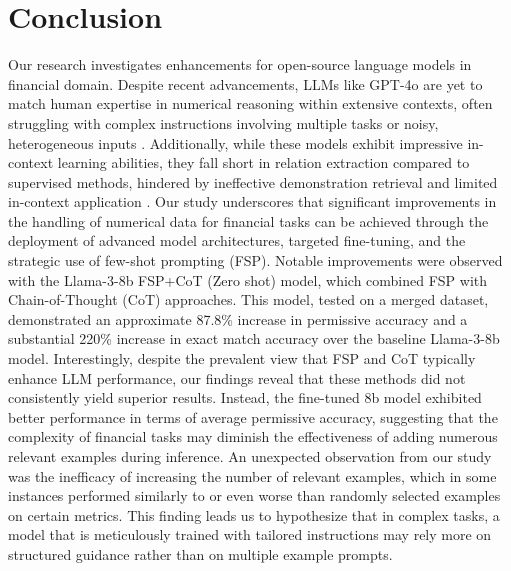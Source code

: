 \documentclass[logo,msc]{infthesis}           %
\begin{document}
\chapter{Conclusion}
Our research investigates enhancements for open-source language models in financial domain. Despite recent advancements, LLMs like GPT-4o are yet to match human expertise in numerical reasoning within extensive contexts, often struggling with complex instructions involving multiple tasks or noisy, heterogeneous inputs \cite{zhao2024docmathevalevaluatingmathreasoning, he2024can}. Additionally, while these models exhibit impressive in-context learning abilities, they fall short in relation extraction compared to supervised methods, hindered by ineffective demonstration retrieval and limited in-context application \cite{li2024recallretrievereasonbetter}. Our study underscores that significant improvements in the handling of numerical data for financial tasks can be achieved through the deployment of advanced model architectures, targeted fine-tuning, and the strategic use of few-shot prompting (FSP). Notable improvements were observed with the Llama-3-8b FSP+CoT (Zero shot) model, which combined FSP with Chain-of-Thought (CoT) approaches. This model, tested on a merged dataset, demonstrated an approximate 87.8\% increase in permissive accuracy and a substantial 220\% increase in exact match accuracy over the baseline Llama-3-8b model. Interestingly, despite the prevalent view that FSP and CoT typically enhance LLM performance, our findings reveal that these methods did not consistently yield superior results. Instead, the fine-tuned 8b model exhibited better performance in terms of average permissive accuracy, suggesting that the complexity of financial tasks may diminish the effectiveness of adding numerous relevant examples during inference. An unexpected observation from our study was the inefficacy of increasing the number of relevant examples, which in some instances performed similarly to or even worse than randomly selected examples on certain metrics. This finding leads us to hypothesize that in complex tasks, a model that is meticulously trained with tailored instructions may rely more on structured guidance rather than on multiple example prompts. 
\end{document}
